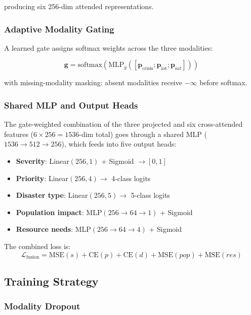 \documentclass[journal]{IEEEtran}
\begin{document}
producing six 256-dim attended representations.

\subsubsection{Adaptive Modality Gating}

A learned gate assigns softmax weights across the three modalities:

\begin{equation}
\mathbf{g} = \text{softmax}(\text{MLP}_g([\mathbf{p}_\text{crisis}; \mathbf{p}_\text{iot}; \mathbf{p}_\text{sat}]))
\end{equation}

with missing-modality masking: absent modalities receive $-\infty$ before softmax.

\subsubsection{Shared MLP and Output Heads}

The gate-weighted combination of the three projected and six cross-attended features ($6 \times 256 = 1536$-dim total) goes through a shared MLP ($1536 \to 512 \to 256$), which feeds into five output heads:

\begin{itemize}
    \item \textbf{Severity}: Linear$(256,1)$ + Sigmoid $\to [0,1]$
    \item \textbf{Priority}: Linear$(256,4) \to$ 4-class logits
    \item \textbf{Disaster type}: Linear$(256,5) \to$ 5-class logits
    \item \textbf{Population impact}: MLP$(256 \to 64 \to 1)$ + Sigmoid
    \item \textbf{Resource needs}: MLP$(256 \to 64 \to 4)$ + Sigmoid
\end{itemize}

The combined loss is:
\begin{equation}
\mathcal{L}_\text{fusion} = \text{MSE}(s) + \text{CE}(p) + \text{CE}(d) + \text{MSE}(pop) + \text{MSE}(res)
\end{equation}

\subsection{Training Strategy}

\subsubsection{Modality Dropout}
\end{document}
